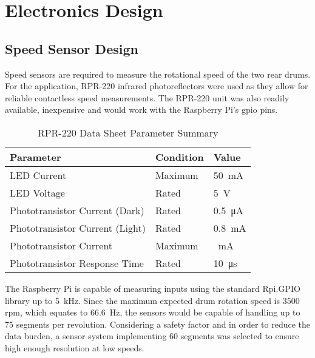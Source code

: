 \newpage

\chapter{Electronics Design}
\label{ch:electronics}
%
\newpage
%
%

\section{Speed Sensor Design}

Speed sensors are required to measure the rotational speed of the two rear drums. For the application, RPR-220 infrared photoreflectors were used as they allow for reliable contactless speed measurements. The RPR-220 unit was also readily available, inexpensive and would work with the Raspberry Pi's \acs{gpio} pins.

\begin{table}[H]
		\renewcommand{\arraystretch}{\tablestretch}
	\centering
	\caption{RPR-220 Data Sheet Parameter Summary}
	\citep{RPR:2015}
	\begin{tabularx}{\textwidth}{X >{\raggedright}p{3cm} >{\raggedright\arraybackslash}p{2cm} }
		\toprule
		Parameter                       & Condition & Value                   \\
		\midrule
		LED Current                     & Maximum   & \SI{50}{\milli\ampere}  \\
		LED Voltage                     & Rated     & \SI{5}{\volt}           \\
		Phototransistor Current (Dark)  & Rated     & \SI{0.5}{\micro\ampere} \\
		Phototransistor Current (Light) & Rated     & \SI{0.8}{\milli\ampere} \\
		Phototransistor Current         & Maximum   & \SI{}{\milli\ampere}    \\
		Phototransistor Response Time   & Rated     & \SI{10}{\micro\second}  \\
		\bottomrule
	\end{tabularx}
	\label{tab:rprdata}
\end{table}

The Raspberry Pi is capable of measuring inputs using the standard Rpi.GPIO library up to \SI{5}{\kilo\hertz}. Since the maximum expected drum rotation speed is 3500 \acs{rpm}, which equates to \SI{66.6}{\hertz}, the sensors would be capable of handling up to 75 segments per revolution. Considering a safety factor and in order to reduce the data burden, a sensor system implementing 60 segments was selected to ensure high enough resolution at low speeds.


